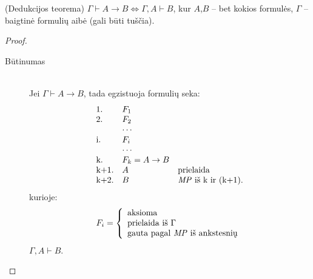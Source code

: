 \begin{prop}
  (Dedukcijos teorema) $\Gamma \vdash A \to B \iff \Gamma,A \vdash B$, 
  kur $A$,$B$ – bet kokios formulės, $\Gamma$ – baigtinė formulių aibė 
  (gali būti tuščia).
  \begin{proof}
    \hfill \\
    \begin{description}
      \item[Būtinumas] \hfill \\
      Jei $\Gamma \vdash A \to B$, tada egzistuoja formulių seka:
      \[
      \begin{array}{l l l}
        \text{1.} & F_{1}   & {}    \\
        \text{2.} & F_{2}   & {}    \\
        {}        & \cdots  & {}    \\
        \text{i.} & F_{i}   & {}    \\
        {}        & \cdots  & {}    \\
        \text{k.} & F_{k} = A \to B & \\
        \text{k+1.} & A & \text{prielaida} \\
        \text{k+2.} & B & \text{\emph{MP} iš k ir (k+1).} \\
      \end{array}
      \]
      kurioje:
      \[
      F_{i} = \left\{
      \begin{array}{l}
        \text{aksioma} \\
        \text{prielaida iš } \Gamma \\
        \text{gauta pagal \emph{MP} iš ankstesnių}
      \end{array} \right.
      \]
      $\Gamma, A \vdash B$.


\end{description}
\end{proof}
\end{prop}
